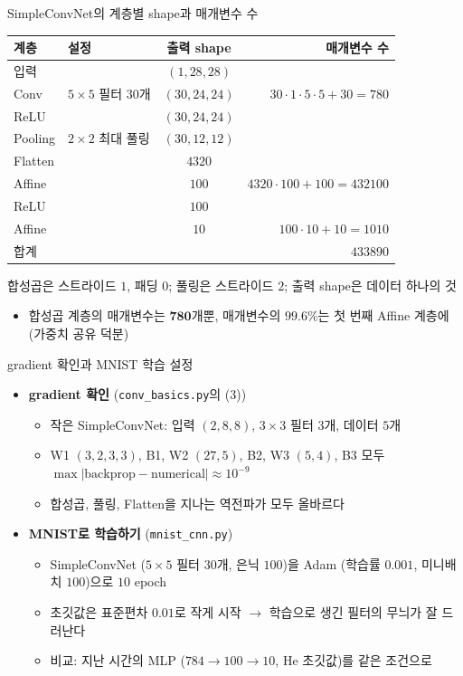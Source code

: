 \documentclass[aspectratio=169,11pt]{beamer}
\newcommand{\figcap}[1]{\par\vskip1mm{\centering\footnotesize\color{black!70}#1\par}}
\begin{document}
\begin{frame}{SimpleConvNet의 계층별 shape과 매개변수 수}
\centering
\small
\begin{tabular}{@{}llcr@{}}
\toprule
계층 & 설정 & 출력 shape & 매개변수 수 \\
\midrule
입력 & & $(1,28,28)$ & \\
Conv & $5\times5$ 필터 $30$개 & $(30,24,24)$ & $30\cdot1\cdot5\cdot5+30=780$ \\
ReLU & & $(30,24,24)$ & \\
Pooling & $2\times2$ 최대 풀링 & $(30,12,12)$ & \\
Flatten & & $4320$ & \\
Affine & & $100$ & $4320\cdot100+100=432100$ \\
ReLU & & $100$ & \\
Affine & & $10$ & $100\cdot10+10=1010$ \\
\midrule
합계 & & & $433890$ \\
\bottomrule
\end{tabular}
\figcap{합성곱은 스트라이드 $1$, 패딩 $0$; 풀링은 스트라이드 $2$; 출력 shape은 데이터 하나의 것}
\raggedright
\begin{itemize}
\item 합성곱 계층의 매개변수는 $\mathbf{780}$개뿐, 매개변수의 $99.6\%$는 첫 번째 Affine 계층에 (가중치 공유 덕분)
\end{itemize}
\end{frame}

\begin{frame}{gradient 확인과 MNIST 학습 설정}
\begin{itemize}
\item \textbf{gradient 확인} (\texttt{conv\_basics.py}의 (3))
  \begin{itemize}
  \item 작은 SimpleConvNet: 입력 $(2,8,8)$, $3\times3$ 필터 $3$개, 데이터 $5$개
  \item W1 $(3,2,3,3)$, B1, W2 $(27,5)$, B2, W3 $(5,4)$, B3 모두 $\max|\text{backprop}-\text{numerical}|\approx10^{-9}$
  \item 합성곱, 풀링, Flatten을 지나는 역전파가 모두 올바르다
  \end{itemize}
\item \textbf{MNIST로 학습하기} (\texttt{mnist\_cnn.py})
  \begin{itemize}
  \item SimpleConvNet ($5\times5$ 필터 $30$개, 은닉 $100$)을 Adam (학습률 $0.001$, 미니배치 $100$)으로 $10$ epoch
  \item 초깃값은 표준편차 $0.01$로 작게 시작 $\to$ 학습으로 생긴 필터의 무늬가 잘 드러난다
  \item 비교: 지난 시간의 MLP ($784\to100\to10$, He 초깃값)를 같은 조건으로
  \end{itemize}
\end{itemize}
\end{frame}
\end{document}
